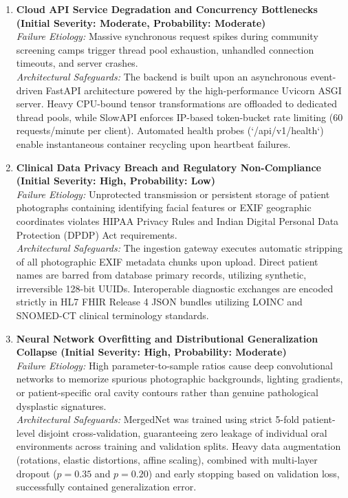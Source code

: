 \documentclass[12pt,a4paper,oneside]{report}
\begin{document}
\begin{enumerate}[label=\textbf{R\arabic*:}, wide=0pt, leftmargin=*]
    \item \textbf{Cloud API Service Degradation and Concurrency Bottlenecks (Initial Severity: Moderate, Probability: Moderate)} \\
    \textit{Failure Etiology:} Massive synchronous request spikes during community screening camps trigger thread pool exhaustion, unhandled connection timeouts, and server crashes. \\
    \textit{Architectural Safeguards:} The backend is built upon an asynchronous event-driven FastAPI architecture powered by the high-performance Uvicorn ASGI server. Heavy CPU-bound tensor transformations are offloaded to dedicated thread pools, while SlowAPI enforces IP-based token-bucket rate limiting (60 requests/minute per client). Automated health probes (`/api/v1/health`) enable instantaneous container recycling upon heartbeat failures.
    
    \item \textbf{Clinical Data Privacy Breach and Regulatory Non-Compliance (Initial Severity: High, Probability: Low)} \\
    \textit{Failure Etiology:} Unprotected transmission or persistent storage of patient photographs containing identifying facial features or EXIF geographic coordinates violates HIPAA Privacy Rules and Indian Digital Personal Data Protection (DPDP) Act requirements. \\
    \textit{Architectural Safeguards:} The ingestion gateway executes automatic stripping of all photographic EXIF metadata chunks upon upload. Direct patient names are barred from database primary records, utilizing synthetic, irreversible 128-bit UUIDs. Interoperable diagnostic exchanges are encoded strictly in HL7 FHIR Release 4 JSON bundles utilizing LOINC and SNOMED-CT clinical terminology standards.
    
    \item \textbf{Neural Network Overfitting and Distributional Generalization Collapse (Initial Severity: High, Probability: Moderate)} \\
    \textit{Failure Etiology:} High parameter-to-sample ratios cause deep convolutional networks to memorize spurious photographic backgrounds, lighting gradients, or patient-specific oral cavity contours rather than genuine pathological dysplastic signatures. \\
    \textit{Architectural Safeguards:} MergedNet was trained using strict 5-fold patient-level disjoint cross-validation, guaranteeing zero leakage of individual oral environments across training and validation splits. Heavy data augmentation (rotations, elastic distortions, affine scaling), combined with multi-layer dropout ($p = 0.35$ and $p = 0.20$) and early stopping based on validation loss, successfully contained generalization error.
\end{enumerate}
\end{document}
